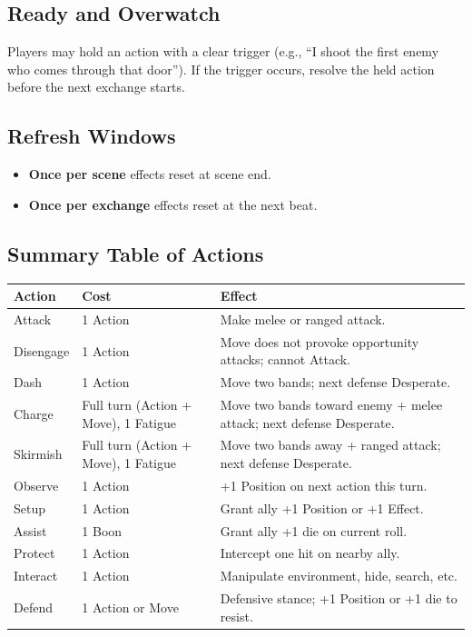 \subsection{Ready and Overwatch}

Players may hold an action with a clear trigger (e.g., ``I shoot the first enemy who comes through that door''). If the trigger occurs, resolve the held action before the next exchange starts.

\subsection{Refresh Windows}

\begin{itemize}
  \item \textbf{Once per scene} effects reset at scene end.
  \item \textbf{Once per exchange} effects reset at the next beat.
\end{itemize}

\subsection{Summary Table of Actions}

\begin{tabular}{@{}lp{5cm}p{5cm}@{}}
\toprule
\textbf{Action} & \textbf{Cost} & \textbf{Effect} \\
\midrule
Attack & 1 Action & Make melee or ranged attack. \\
Disengage & 1 Action & Move does not provoke opportunity attacks; cannot Attack. \\
Dash & 1 Action & Move two bands; next defense Desperate. \\
Charge & Full turn (Action + Move), 1 Fatigue & Move two bands toward enemy + melee attack; next defense Desperate. \\
Skirmish & Full turn (Action + Move), 1 Fatigue & Move two bands away + ranged attack; next defense Desperate. \\
Observe & 1 Action & +1 Position on next action this turn. \\
Setup & 1 Action & Grant ally +1 Position or +1 Effect. \\
Assist & 1 Boon & Grant ally +1 die on current roll. \\
Protect & 1 Action & Intercept one hit on nearby ally. \\
Interact & 1 Action & Manipulate environment, hide, search, etc. \\
Defend & 1 Action or Move & Defensive stance; +1 Position or +1 die to resist. \\
\bottomrule
\end{tabular}


